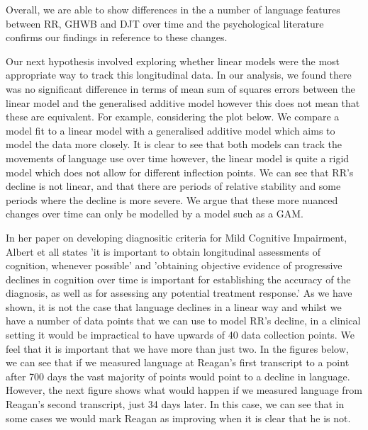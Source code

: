 \documentclass[10pt, letterpaper, twoside, openany]{thesis}
\begin{document}
\par 
Overall, we are able to show differences in the a number of language features between RR, GHWB and DJT over time and the psychological literature confirms our findings in reference to these changes.
\par
Our next hypothesis involved exploring whether linear models were the most appropriate way to track this longitudinal data. In our analysis, we found there was no significant difference in terms of mean sum of squares errors between the linear model and the generalised additive model however this does not mean that these are equivalent. For example, considering the plot below. We compare a model fit to a linear model with a generalised additive model which aims to model the data more closely. It is clear to see that both models can track the movements of language use over time however, the linear model is quite a rigid model which does not allow for different inflection points. We can see that RR's decline is not linear, and that there are periods of relative stability and some periods where the decline is more severe. We argue that these more nuanced changes over time can only be modelled by a model such as a GAM.
\par
In her paper on developing diagnositic criteria for Mild Cognitive Impairment, Albert et all \cite{Albert2011} states 'it is important to obtain longitudinal assessments of cognition, whenever possible' and 'obtaining objective evidence of progressive declines in cognition over time is important for establishing the accuracy of the diagnosis, as well as for
assessing any potential treatment response.' As we have shown, it is not the case that language declines in a linear way and whilst we have a number of data points that we can use to model RR's decline, in a clinical setting it would be impractical to have upwards of 40 data collection points. We feel that  it is important that we have more than just two. In the figures below, we can see that if we measured language at Reagan's first transcript to a point after 700 days the vast majority of points would point to a decline in language. However, the next figure shows what would happen if we measured language from Reagan's second transcript, just 34 days later. In this case, we can see that in some cases we would mark Reagan as improving when it is clear that he is not.
\par 
\end{document}
